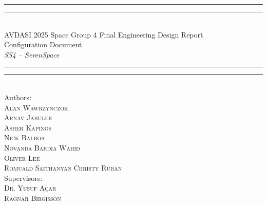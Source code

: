 \documentclass[a4paper, 11pt, conference]{IEEEtran}
\begin{document}
\titleformat{\subsubsection}{\normalsize\bfseries}{\thesubsubsection}{1em}{}
\begin{titlepage}

	\vspace*{8mm}

	\begin{center}
		\rule[0.5ex]{\linewidth}{2pt}\vspace*{-\baselineskip}\vspace*{3.2pt}
		\rule[0.5ex]{\linewidth}{1pt}\\[\baselineskip]
		{\LARGE {AVDASI 2025 Space Group 4 Final Engineering Design Report}}\\[4mm]
        {\Large{Configuration Document}}\\[4mm]
		{\Large \textit{SS4 – SerenSpace}}\\
		\rule[0.5ex]{\linewidth}{1pt}\vspace*{-\baselineskip}\vspace{4.2pt}
		\rule[0.5ex]{\linewidth}{2pt}\\

		\vspace{6.5mm}
		{\large Authors: \\
			\textsc{Alan Wawrzyńczok\\
            Arnav Jabulee\\
            Asher Kapinos\\
            Nick Balboa\\
            Novanda Bardia Wahid\\
            Oliver Lee\\
            Romuald Saithanyan Christy Ruban}}\\

		\vspace{6.5mm}
		{\large Supervisors: \\
			\textsc{Dr. Yusuf Açar}\\
            \textsc{Ragnar Birgisson}}


\end{center}
\end{titlepage}
\end{document}
